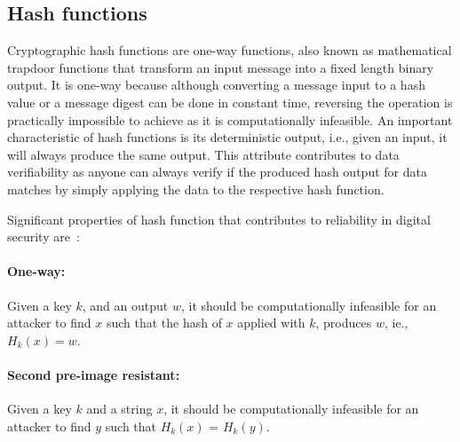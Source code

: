 \subsection{Hash functions}
Cryptographic hash functions are one-way functions, also known as mathematical
trapdoor functions that transform an input message into a fixed length binary
output. It is one-way because although converting a message input to a hash
value or a message digest can be done in constant time, reversing the operation
is practically impossible to achieve as it is computationally infeasible. An
important characteristic of hash functions is its deterministic output, i.e.,
given an input, it will always produce the same output. This attribute
contributes to data verifiability as anyone can always verify if the produced
hash output for data matches by simply applying the data to the respective hash
function. \par 
Significant properties of hash function that contributes to reliability in
digital security are~\cite{katz1996handbook}: 
\paragraph{One-way:} Given a key $k$, and an output $w$, it should be
computationally infeasible for an attacker to find $x$ such that the hash of
$x$ applied with $k$, produces $w$, ie., $H_k(x) = w$.
\paragraph{Second pre-image resistant:} Given a key $k$ and a string $x$, it
should be computationally infeasible for an attacker to find $y$ such that
$H_k(x)$ = $H_k(y)$. 
